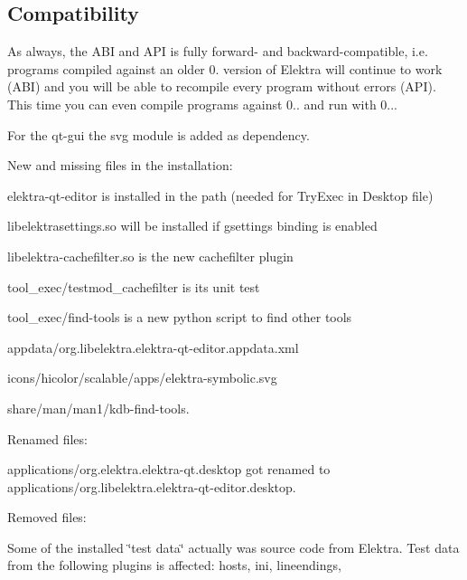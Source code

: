\subsection*{Compatibility}

As always, the A\+B\+I and A\+P\+I is fully forward-\/ and backward-\/compatible, i.\+e. programs compiled against an older 0. version of Elektra will continue to work (A\+B\+I) and you will be able to recompile every program without errors (A\+P\+I). This time you can even compile programs against 0.. and run with 0...

For the qt-\/gui the svg module is added as dependency.

New and missing files in the installation\+:


\begin{DoxyItemize}
\item {\ttfamily elektra-\/qt-\/editor} is installed in the path (needed for Try\+Exec in Desktop file)
\item {\ttfamily libelektrasettings.\+so} will be installed if {\ttfamily gsettings} binding is enabled
\item {\ttfamily libelektra-\/cachefilter.\+so} is the new cachefilter plugin
\item {\ttfamily tool\+\_\+exec/testmod\+\_\+cachefilter} is its unit test
\item {\ttfamily tool\+\_\+exec/find-\/tools} is a new python script to find other tools
\item {\ttfamily appdata/org.\+libelektra.\+elektra-\/qt-\/editor.\+appdata.\+xml}
\item {\ttfamily icons/hicolor/scalable/apps/elektra-\/symbolic.\+svg}
\item {\ttfamily share/man/man1/kdb-\/find-\/tools.}
\end{DoxyItemize}

Renamed files\+:


\begin{DoxyItemize}
\item {\ttfamily applications/org.\+elektra.\+elektra-\/qt.\+desktop} got renamed to {\ttfamily applications/org.\+libelektra.\+elektra-\/qt-\/editor.\+desktop}.
\end{DoxyItemize}

Removed files\+:


\begin{DoxyItemize}
\item Some of the installed \char`\"{}test data\char`\"{} actually was source code from Elektra. Test data from the following plugins is affected\+: {\ttfamily hosts}, {\ttfamily ini}, {\ttfamily lineendings},
\end{DoxyItemize}

